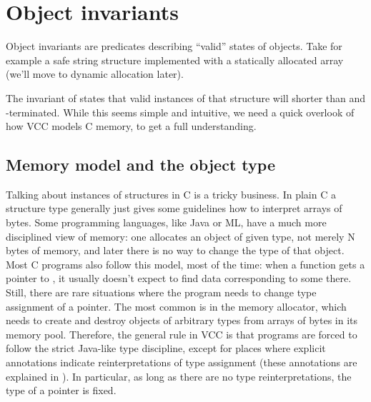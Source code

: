 \section{Object invariants}

Object invariants are predicates describing ``valid'' states of objects.
Take for example a safe string structure implemented with a
statically allocated array (we'll move to dynamic allocation later).


\noindent
The invariant of  states that valid instances
of that structure will shorter than  and -terminated.
While this seems simple and intuitive, we need a quick overlook of how VCC
models C memory, to get a full understanding.

\subsection{Memory model and the object type}

Talking about instances of structures in C is a tricky business. 
In plain C a structure type generally just gives some guidelines how to interpret
arrays of bytes.
Some programming languages, like Java or ML, have a much more disciplined
view of memory:
one allocates an object of given type, not merely N bytes of memory,
and later there is no way to change the type of that object.
Most C programs also follow this model, most of the time:
when a function gets a pointer to , it usually doesn't
expect to find data corresponding to some  there.
Still, there are rare situations where the program needs to
change type assignment of a pointer.
The most common is in the memory allocator, which needs to create
and destroy objects of arbitrary types from arrays of bytes
in its memory pool.
Therefore, the general rule in VCC is that programs are forced to
follow the strict Java-like type discipline, except for places
where explicit annotations indicate reinterpretations of type assignment
(these annotations are explained in ).
In particular, as long as there are no type reinterpretations,
the type of a pointer is fixed.


